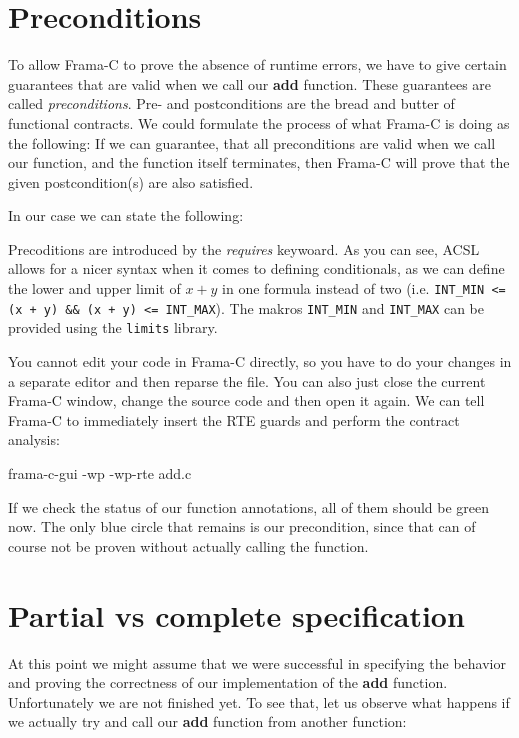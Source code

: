 \section{Preconditions}

To allow Frama-C to prove the absence of runtime errors, we have to give certain guarantees that are valid when we call our \textbf{add} function. These guarantees are called \emph{preconditions}. Pre- and postconditions are the bread and butter of functional contracts. We could formulate the process of what Frama-C is doing as the following: If we can guarantee, that all preconditions are valid when we call our function, and the function itself terminates, then Frama-C will prove that the given postcondition(s) are also satisfied. 

In our case we can state the following:


Precoditions are introduced by the \emph{requires} keywoard. As you can see, ACSL allows for a nicer syntax when it comes to defining conditionals, as we can define the lower and upper limit of $x+y$ in one formula instead of two (i.e. \texttt{INT_MIN <= (x + y) && (x + y) <= INT_MAX}). The makros \texttt{INT_MIN} and \texttt{INT_MAX} can be provided using the \texttt{limits} library.

You cannot edit your code in Frama-C directly, so you have to do your changes in a separate editor and then reparse the file. You can also just close the current Frama-C window, change the source code and then open it again. We can tell Frama-C to immediately insert the RTE guards and perform the contract analysis:

\begin{ubuntu}
frama-c-gui -wp -wp-rte add.c
\end{ubuntu}

If we check the status of our function annotations, all of them should be green now. The only blue circle that remains is our precondition, since that can of course not be proven without actually calling the function. 

\section{Partial vs complete specification}

At this point we might assume that we were successful in specifying the behavior and proving the correctness of our implementation of the \textbf{add} function. Unfortunately we are not finished yet. To see that, let us observe what happens if we actually try and call our \textbf{add} function from another function:

